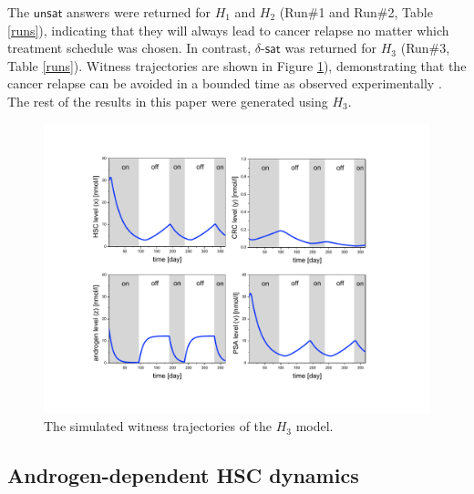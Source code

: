 The $\mathsf{unsat}$ answers were returned for $H_1$ and $H_2$ (Run\#1 and Run\#2, Table \ref{runs}), indicating that they will always lead to cancer relapse no matter which 
treatment schedule 
was chosen. In contrast, $\delta$-$\mathsf{sat}$ was returned for $H_3$ (Run\#3, Table \ref{runs}). Witness trajectories are shown in Figure \ref{prostate-fig1}), demonstrating that the cancer relapse can be avoided in a bounded time as observed experimentally \cite{ bruchovsky06,bruchovsky07}. The rest of the results in this paper were generated using $H_3$.

\begin{figure}[t]
\centering
\includegraphics[scale=0.45]{fig-witness}
\caption{The simulated witness trajectories of the $H_3$ model.}
\label{prostate-fig1}
\end{figure}

\subsection{Androgen-dependent HSC dynamics}

